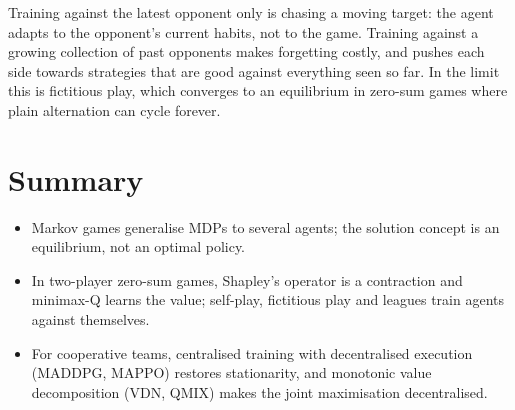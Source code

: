 \begin{intuition}
  Training against the latest opponent only is chasing a moving target:
  the agent adapts to the opponent's current habits, not to the game.
  Training against a growing collection of past opponents makes forgetting
  costly, and pushes each side towards strategies that are good against
  everything seen so far. In the limit this is fictitious play, which
  converges to an equilibrium in zero-sum games where plain alternation can
  cycle forever.
\end{intuition}

\section{Summary}

\begin{itemize}[nosep]
  \item Markov games generalise MDPs to several agents; the solution
    concept is an equilibrium, not an optimal policy.
  \item In two-player zero-sum games, Shapley's operator is a contraction
    and minimax-Q learns the value; self-play, fictitious play and leagues
    train agents against themselves.
  \item For cooperative teams, centralised training with decentralised
    execution (MADDPG, MAPPO) restores stationarity, and monotonic value
    decomposition (VDN, QMIX) makes the joint maximisation decentralised.
\end{itemize}
